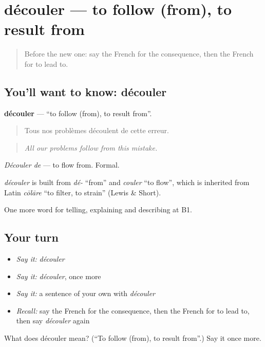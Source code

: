 \section[découler]{découler — to follow (from), to result from}

\label{lesson:FR-C346-decouler}



\begin{quote}
Before the new one: say the French for the consequence, then the French for to lead to.
\end{quote}

\subsection*{You'll want to know: découler}
\textbf{découler} — \textquotedblleft{}to follow (from), to result from\textquotedblright{}.

\begin{quote}
Tous nos problèmes découlent de cette erreur.
\end{quote}

\begin{quote}
\emph{All our problems follow from this mistake.}
\end{quote}

\emph{Découler de} — to flow from. Formal.

\begin{cousinweb}
\emph{découler} is built from \emph{dé-} \textquotedblleft{}from\textquotedblright{} and \emph{couler} \textquotedblleft{}to flow\textquotedblright{}, which is inherited from Latin \emph{cōlāre} \textquotedblleft{}to filter, to strain\textquotedblright{} (Lewis \& Short).
\end{cousinweb}

\begin{grammarlens}[title={What you've built}]
One more word for telling, explaining and describing at B1.
\end{grammarlens}

\subsection*{Your turn}
\begin{itemize}
\raggedright
  \item \emph{Say it:} \emph{découler}
  \item \emph{Say it:} \emph{découler}, once more
  \item \emph{Say it:} a sentence of your own with \emph{découler}
  \item \emph{Recall:} say the French for the consequence, then the French for to lead to, then say \emph{découler} again
\end{itemize}

\begin{tcolorbox}[breakable,colback=teal!4,colframe=teal!35!black,title={Before you move on}]
What does découler mean? (\textquotedblleft{}To follow (from), to result from\textquotedblright{}.) Say it once more.
\end{tcolorbox}

